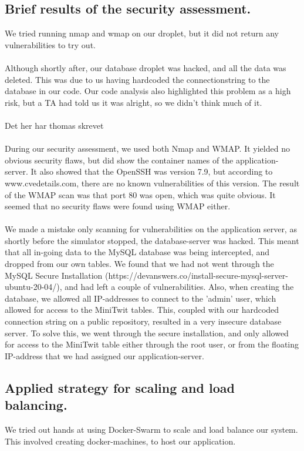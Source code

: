 \documentclass{article}
\begin{document}
\subsection{Brief results of the security assessment.}
We tried running nmap and wmap on our droplet, but it did not return any vulnerabilities to try out.
\\\\
Although shortly after, our database droplet was hacked, and all the data was deleted. This was due to us having hardcoded the connectionstring to the database in our code. Our code analysis also highlighted this problem as a high risk, but a TA had told us it was alright, so we didn't think much of it.
\\\\
Det her har thomas skrevet \\\\
During our security assessment, we used both Nmap and WMAP. It yielded no obvious security flaws, but did show the container names of the application-server. It also showed that the OpenSSH was version 7.9, but according to www.cvedetails.com, there are no known vulnerabilities of this version. The result of the WMAP scan was that port 80 was open, which was quite obvious. It seemed that no security flaws were found using WMAP either.
\\\\
We made a mistake only scanning for vulnerabilities on the application server, as shortly before the simulator stopped, the database-server was hacked. This meant that all in-going data to the MySQL database was being intercepted, and dropped from our own tables. We found that we had not went through the MySQL Secure Installation (https://devanswers.co/install-secure-mysql-server-ubuntu-20-04/), and had left a couple of vulnerabilities. Also, when creating the database, we allowed all IP-addresses to connect to the 'admin' user, which allowed for access to the MiniTwit tables. This, coupled with our hardcoded connection string on a public repository, resulted in a very insecure database server. To solve this, we went through the secure installation, and only allowed for access to the MiniTwit table either through the root user, or from the floating IP-address that we had assigned our application-server.

\subsection{Applied strategy for scaling and load balancing.}
We tried out hands at using Docker-Swarm to scale and load balance our system. This involved creating docker-machines, to host our application. \\\\
\end{document}
